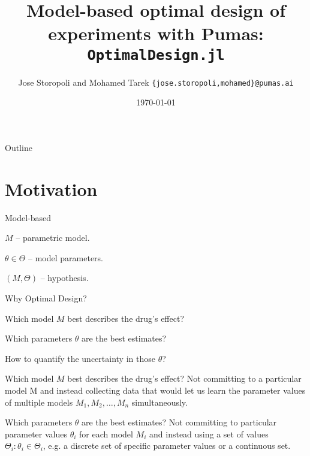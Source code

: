 \documentclass[aspectratio=169]{beamer}                    %
\title[\texttt{OptimalDesign.jl}]{Model-based optimal design of experiments with Pumas: \texttt{OptimalDesign.jl}}
\author[PumasAI]{Jose Storopoli and Mohamed Tarek \texttt{\{jose.storopoli,mohamed\}@pumas.ai}}
\institute{PumasAI}
\date{\today}
\begin{document}
\maketitle

\begin{frame}{Outline}
	\tableofcontents
\end{frame}

\section{Motivation}
\begin{frame}{Model-based}
	\begin{vfilleditems}
		\item $M$ -- parametric model.
		\item $\theta \in \Theta$ -- model parameters.
		\item $(M, \Theta)$ -- hypothesis.
	\end{vfilleditems}
\end{frame}

\begin{frame}{Why Optimal Design?}
	\begin{vfilleditems}
		\item Which model $M$ best describes the drug's effect?
		\item Which parameters $\theta$ are the best estimates?
		\item How to quantify the uncertainty in those $\theta$?
	\end{vfilleditems}
\end{frame}

\begin{frame}{Which model $M$ best describes the drug's effect?}
	Not committing to a particular model M and instead collecting data
	that would let us learn the parameter values of multiple models
	$M_1, M_2, \ldots , M_n$ simultaneously.
\end{frame}

\begin{frame}{Which parameters $\theta$ are the best estimates?}
	Not committing to particular parameter values $\theta_i$ for
	each model $M_i$ and instead using a set of values
	$\Theta_i: \theta_i \in \Theta_i$,
	e.g. a discrete set of specific parameter values or a continuous set.
\end{frame}
\end{document}
